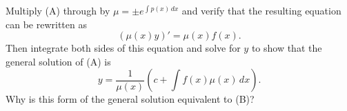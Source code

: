 \begin{exerciselist}
\begin{alist}
    \item %
    Multiply (A) through by $\mu=\pm e^{\int p(x)\,dx}$ and verify that the resulting equation can
    be rewritten as
    \[
      (\mu(x)y)'=\mu(x)f(x).
    \]
    Then integrate both sides of this equation and solve for $y$ to show that the general solution
    of (A) is
    \[
      y=\frac{1}{\mu(x)}\left(c+\int f(x)\mu(x)\,dx\right).
    \]
    Why is this form of the general solution equivalent to (B)?
  \end{alist}
\end{exerciselist}
